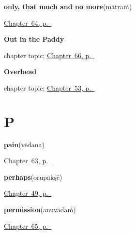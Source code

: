 \noindent\begin{minipage}[t]{\linewidth}
\raggedright
\textbf{only, that much and no more}\enspace\emph{}\enspace(mātraṁ)\par
\footnotesize \hyperref[ch:ml-five-words-that-join]{Chapter~64, p.~\pageref*{ch:ml-five-words-that-join}}
\end{minipage}\par\smallskip

\noindent\begin{minipage}[t]{\linewidth}
\raggedright
\textbf{Out in the Paddy}\par
\footnotesize chapter topic; \hyperref[ch:ml-out-in-the-paddy]{Chapter~66, p.~\pageref*{ch:ml-out-in-the-paddy}}
\end{minipage}\par\smallskip

\noindent\begin{minipage}[t]{\linewidth}
\raggedright
\textbf{Overhead}\par
\footnotesize chapter topic; \hyperref[ch:ml-overhead]{Chapter~53, p.~\pageref*{ch:ml-overhead}}
\end{minipage}\par\smallskip

\section*{P}

\noindent\begin{minipage}[t]{\linewidth}
\raggedright
\textbf{pain}\enspace\emph{}\enspace(vēdana)\par
\footnotesize \hyperref[ch:ml-how-the-body-reports]{Chapter~63, p.~\pageref*{ch:ml-how-the-body-reports}}
\end{minipage}\par\smallskip

\noindent\begin{minipage}[t]{\linewidth}
\raggedright
\textbf{perhaps}\enspace\emph{}\enspace(orupakṣē)\par
\footnotesize \hyperref[ch:ml-replies]{Chapter~49, p.~\pageref*{ch:ml-replies}}
\end{minipage}\par\smallskip

\noindent\begin{minipage}[t]{\linewidth}
\raggedright
\textbf{permission}\enspace\emph{}\enspace(anuvādaṁ)\par
\footnotesize \hyperref[ch:ml-asking-well]{Chapter~65, p.~\pageref*{ch:ml-asking-well}}
\end{minipage}\par\smallskip

